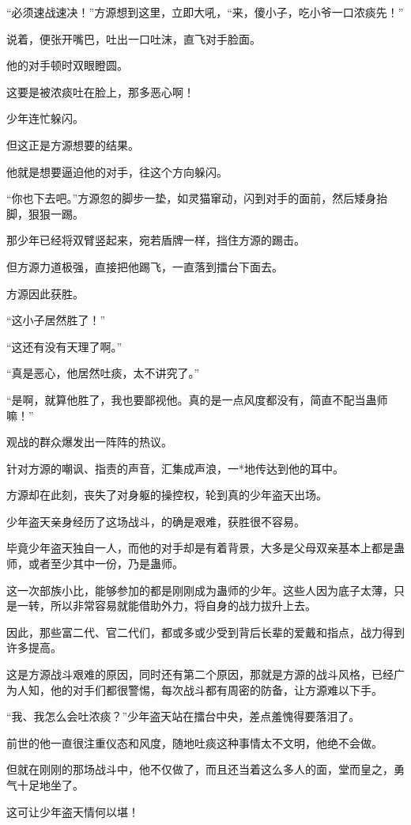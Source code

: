 \begin{this_body}
“必须速战速决！”方源想到这里，立即大吼，“来，傻小子，吃小爷一口浓痰先！”

说着，便张开嘴巴，吐出一口吐沫，直飞对手脸面。

他的对手顿时双眼瞪圆。

这要是被浓痰吐在脸上，那多恶心啊！

少年连忙躲闪。

但这正是方源想要的结果。

他就是想要逼迫他的对手，往这个方向躲闪。

“你也下去吧。”方源忽的脚步一垫，如灵猫窜动，闪到对手的面前，然后矮身抬脚，狠狠一踢。

那少年已经将双臂竖起来，宛若盾牌一样，挡住方源的踢击。

但方源力道极强，直接把他踢飞，一直落到擂台下面去。

方源因此获胜。

“这小子居然胜了！”

“这还有没有天理了啊。”

“真是恶心，他居然吐痰，太不讲究了。”

“是啊，就算他胜了，我也要鄙视他。真的是一点风度都没有，简直不配当蛊师嘛！”

观战的群众爆发出一阵阵的热议。

针对方源的嘲讽、指责的声音，汇集成声浪，一*地传达到他的耳中。

方源却在此刻，丧失了对身躯的操控权，轮到真的少年盗天出场。

少年盗天亲身经历了这场战斗，的确是艰难，获胜很不容易。

毕竟少年盗天独自一人，而他的对手却是有着背景，大多是父母双亲基本上都是蛊师，或者至少其中一份，乃是蛊师。

这一次部族小比，能够参加的都是刚刚成为蛊师的少年。这些人因为底子太薄，只是一转，所以非常容易就能借助外力，将自身的战力拔升上去。

因此，那些富二代、官二代们，都或多或少受到背后长辈的爱戴和指点，战力得到许多提高。

这是方源战斗艰难的原因，同时还有第二个原因，那就是方源的战斗风格，已经广为人知，他的对手们都很警惕，每次战斗都有周密的防备，让方源难以下手。

“我、我怎么会吐浓痰？”少年盗天站在擂台中央，差点羞愧得要落泪了。

前世的他一直很注重仪态和风度，随地吐痰这种事情太不文明，他绝不会做。

但就在刚刚的那场战斗中，他不仅做了，而且还当着这么多人的面，堂而皇之，勇气十足地坐了。

这可让少年盗天情何以堪！


\end{this_body}

